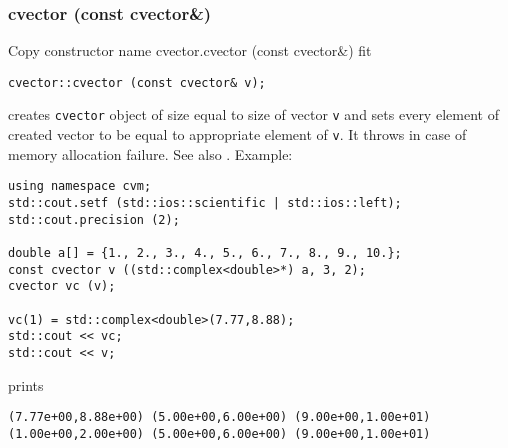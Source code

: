 \subsubsection{cvector (const cvector\&)}
Copy constructor%
\pdfdest name {cvector.cvector (const cvector&)} fit
\begin{verbatim}
cvector::cvector (const cvector& v);
\end{verbatim}
creates  \verb"cvector" object of size equal to size of
vector \verb"v" and sets every element of created vector to be equal to
appropriate element of \verb"v".
It throws  
in case of memory allocation failure.
See also .
Example:
\begin{Verbatim}
using namespace cvm;
std::cout.setf (std::ios::scientific | std::ios::left);
std::cout.precision (2);

double a[] = {1., 2., 3., 4., 5., 6., 7., 8., 9., 10.};
const cvector v ((std::complex<double>*) a, 3, 2);
cvector vc (v);

vc(1) = std::complex<double>(7.77,8.88);
std::cout << vc;
std::cout << v;
\end{Verbatim}
prints
\begin{Verbatim}
(7.77e+00,8.88e+00) (5.00e+00,6.00e+00) (9.00e+00,1.00e+01)
(1.00e+00,2.00e+00) (5.00e+00,6.00e+00) (9.00e+00,1.00e+01)
\end{Verbatim}
\newpage


